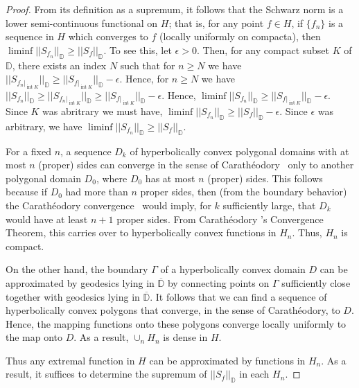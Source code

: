 \documentclass{lms}
\newcommand{\D}{\mathbb D}
\newcommand{\norm}[1]{\lvert\lvert#1\rvert\rvert}
\newcommand{\Snf}{\norm{S_f}_\D}
\newcommand{\e}{\epsilon}
\DeclareMathOperator{\interior}{int}
\numberwithin{equation}{section}
\begin{document}
\begin{proof}

From its definition as a supremum, it follows that
the Schwarz norm is a lower semi-continuous functional on $H$; 
that is, for any point $f \in H$, if $\{f_n\}$ is a sequence in
 $H$ which converges to $f$ (locally uniformly on compacta), 
then $\liminf \norm{S_{f_n}}_\D \ge \Snf$.  
To see this, let $\e > 0$.  
Then, for any compact subset $K$ of $\D$,
 there exists an index $N$ such that for $n \ge N$ we have
$\norm{S_{f_n\vert_{\interior K}}}_\D 
\ge \norm{S_{f\vert_{\interior K}}}_\D - \e$. 
 Hence, for $n \ge N$ we have 
$\norm{S_{f_n}}_\D\ge \norm{S_{f_n\vert_{\interior K}}}_\D 
\ge \norm{S_{f\vert_{\interior K}}}_\D - \e$.  
Hence, $\liminf \norm{S_{f_n}}_\D \ge \norm{S_{f\vert_{\interior K}}}_\D - \e$. 
 Since $K$ was abritrary we must have, $\liminf \norm{S_{f_n}}_\D \ge \Snf -
 \e$. 
 Since $\e$ was arbitrary, we have $\liminf \norm{S_{f_n}}_\D \ge \Snf$.  


For a fixed $n$, a sequence $D_k$ of hyperbolically convex 
polygonal domains
with at most $n$ (proper) sides can converge in the sense of 
Carath{\'e}odory~\cite{cP92}
only to another polygonal domain $D_0$, 
where $D_0$ has at most $n$ (proper) sides.  This 
follows because if $D_0$ had more than $n$ proper sides, 
then (from the boundary behavior) 
the Carath{\'e}odory  convergence~\cite{cP92}
would imply, for $k$ sufficiently large, 
that $D_k$ would have at least $n+1$ proper sides.  
From Carath{\'e}odory 's Convergence Theorem, 
this carries over to hyperbolically convex functions in $H_n$.  
Thus, $H_n$ is compact.

On the other hand, the boundary $\Gamma$ of a hyperbolically convex 
domain $D$ can be approximated by geodesics lying 
in $\overline{\D}$ by connecting points on $\Gamma$ 
sufficiently close together with geodesics lying 
in $\overline{\D}$.  It follows that we can find a sequence of hyperbolically
convex polygons that converge, in the sense of Carath\'eodory, to $D$.
Hence, %
the mapping functions onto these polygons converge locally uniformly
to the map onto $D$. As a result, $\cup_n H_n$ is dense in $H$.  


Thus any extremal function in $H$ can be approximated by functions in $H_n$. 
As a result, it suffices to determine the supremum of 
$\norm{S_{f}}_\D$ in each $H_n$.

\end{proof}

\end{document}
